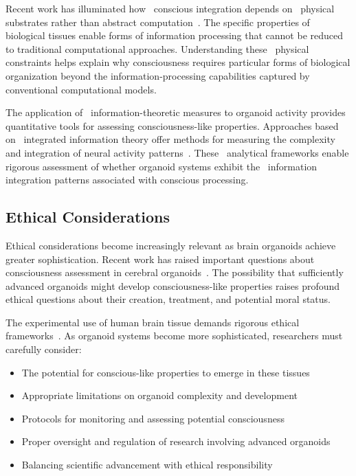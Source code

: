 Recent work has illuminated how~ conscious integration depends on~ physical substrates rather than abstract computation~\cite{Krishnan2019, hales2022electromagnetism}. The specific properties of biological tissues enable forms of information processing that cannot be reduced to traditional computational approaches. Understanding these~ physical constraints helps explain why consciousness requires particular forms of biological organization beyond the information-processing capabilities captured by conventional computational models.

The application of~ information-theoretic measures to organoid activity provides quantitative tools for assessing consciousness-like properties. Approaches based on~ integrated information theory offer methods for measuring the complexity and integration of neural activity patterns~\cite{Tononi2016, Barrett2011}. These~ analytical frameworks enable rigorous assessment of whether organoid systems exhibit the~ information integration patterns associated with conscious processing.

\subsection*{Ethical Considerations}

Ethical considerations become increasingly relevant as brain organoids achieve greater sophistication. Recent work has raised important questions about consciousness assessment in cerebral organoids~\cite{Lavazza2018, butlin2023consciousnessartificialintelligenceinsights}. The possibility that sufficiently advanced organoids might develop consciousness-like properties raises profound ethical questions about their creation, treatment, and potential moral status.

The experimental use of human brain tissue demands rigorous ethical frameworks~\cite{Farahany2018, birch2024edge}. As organoid systems become more sophisticated, researchers must carefully consider:

\begin{itemize}
  \item The potential for conscious-like properties to emerge in these tissues
  \item Appropriate limitations on organoid complexity and development
  \item Protocols for monitoring and assessing potential consciousness
  \item Proper oversight and regulation of research involving advanced organoids
  \item Balancing scientific advancement with ethical responsibility
\end{itemize}

